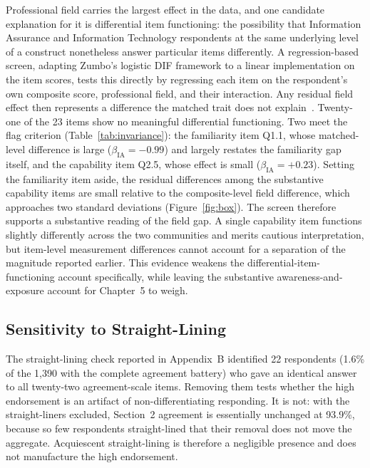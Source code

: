 Professional field carries the largest effect in the data, and one candidate explanation for it is differential item functioning: the possibility that Information Assurance and Information Technology respondents at the same underlying level of a construct nonetheless answer particular items differently. A regression-based screen, adapting Zumbo's logistic DIF framework to a linear implementation on the item scores, tests this directly by regressing each item on the respondent's own composite score, professional field, and their interaction. Any residual field effect then represents a difference the matched trait does not explain~\parencite{Zumbo_1999}. Twenty-one of the 23 items show no meaningful differential functioning. Two meet the flag criterion (Table~\ref{tab:invariance}): the familiarity item Q1.1, whose matched-level difference is large ($\beta_{\text{IA}}=-0.99$) and largely restates the familiarity gap itself, and the capability item Q2.5, whose effect is small ($\beta_{\text{IA}}=+0.23$). Setting the familiarity item aside, the residual differences among the substantive capability items are small relative to the composite-level field difference, which approaches two standard deviations (Figure~\ref{fig:box}). The screen therefore supports a substantive reading of the field gap. A single capability item functions slightly differently across the two communities and merits cautious interpretation, but item-level measurement differences cannot account for a separation of the magnitude reported earlier. This evidence weakens the differential-item-functioning account specifically, while leaving the substantive awareness-and-exposure account for Chapter~5 to weigh.



\subsection{Sensitivity to Straight-Lining}

The straight-lining check reported in Appendix~B identified 22 respondents (1.6\% of the 1{,}390 with the complete agreement battery) who gave an identical answer to all twenty-two agreement-scale items. Removing them tests whether the high endorsement is an artifact of non-differentiating responding. It is not: with the straight-liners excluded, Section~2 agreement is essentially unchanged at 93.9\%, because so few respondents straight-lined that their removal does not move the aggregate. Acquiescent straight-lining is therefore a negligible presence and does not manufacture the high endorsement.

